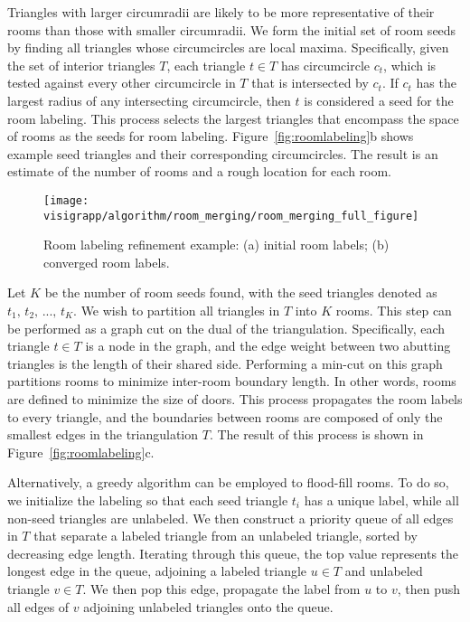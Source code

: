 \documentclass[12pt,onecolumn,oneside]{book}
\begin{document}
Triangles with larger circumradii are likely to be more representative of their rooms than those with smaller circumradii.  We form the initial set of room seeds by finding all triangles whose circumcircles are local maxima.  Specifically, given the set of interior triangles $T$, each triangle $t \in T$ has circumcircle $c_t$, which is tested against every other circumcircle in $T$ that is intersected by $c_t$.  If $c_t$ has the largest radius of any intersecting circumcircle, then $t$ is considered a seed for the room labeling.  This process selects the largest triangles that encompass the space of rooms as the seeds for room labeling.  Figure~\ref{fig:roomlabeling}b shows example seed triangles and their corresponding circumcircles.  The result is an estimate of the number of rooms and a rough location for each room.


\begin{figure}[t]
  \centering
  \texttt{[image: visigrapp/algorithm/room\_merging/room\_merging\_full\_figure]}
  \caption[Room labeling refinement example.]{Room labeling refinement example: (a) initial room labels; (b) converged room labels.}
  \label{fig:roommerging}
\end{figure}

Let $K$ be the number of room seeds found, with the seed triangles denoted as $t_1,\,t_2,\,...,\,t_K$.  We wish to partition all triangles in $T$ into $K$ rooms.  This step can be performed as a graph cut on the dual of the triangulation.  Specifically, each triangle $t \in T$ is a node in the graph, and the edge weight between two abutting triangles is the length of their shared side.  Performing a min-cut on this graph partitions rooms to minimize inter-room boundary length.  In other words, rooms are defined to minimize the size of doors.  This process propagates the room labels to every triangle, and the boundaries between rooms are composed of only the smallest edges in the triangulation $T$.  The result of this process is shown in Figure~\ref{fig:roomlabeling}c.

Alternatively, a greedy algorithm can be employed to flood-fill rooms.  To do so, we initialize the labeling so that each seed triangle $t_i$ has a unique label, while all non-seed triangles are unlabeled.  We then construct a priority queue of all edges in $T$ that separate a labeled triangle from an unlabeled triangle, sorted by decreasing edge length.  Iterating through this queue, the top value represents the longest edge in the queue, adjoining a labeled triangle $u \in T$ and unlabeled triangle $v \in T$.  We then pop this edge, propagate the label from $u$ to $v$, then push all edges of $v$ adjoining unlabeled triangles onto the queue.  
\end{document}
